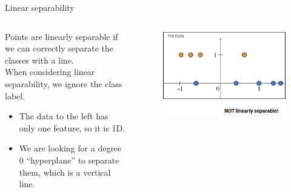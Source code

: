 \documentclass[aspectratio=169]{../latex_main/tntbeamer}  %
\begin{document}
	  \begin{frame}{Linear separability}
	    \begin{columns}
	        \begin{column}{.5\textwidth}
	            Points are linearly separable if we can correctly separate the classes with a line.\\
	            When considering linear separability, we ignore the class label. 

	            \begin{itemize}
	                \item The data to the left has only one feature, so it is 1D.
	                \item We are looking for a degree 0 “hyperplane” to separate them, which is a vertical line.
	            \end{itemize}  
	        \end{column}
	        
	        
	        
	        \begin{column}{.5\textwidth}
	                \begin{figure}
	                    \centering
	                    \includegraphics[scale=.35]{Bild45}
	                \end{figure}
	                
	        \end{column}
	    \end{columns}
	 \end{frame}
	 
\end{document}
